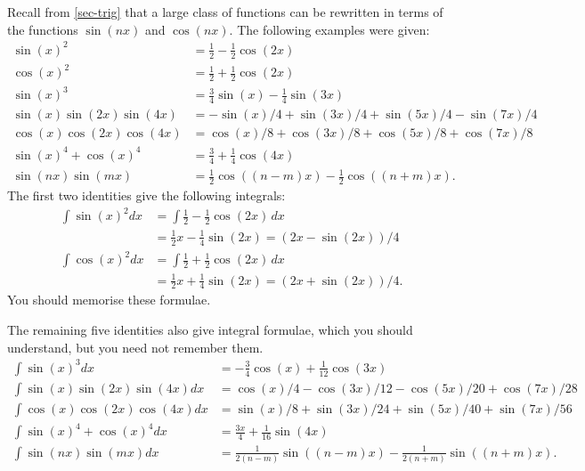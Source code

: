 \documentclass[a4paper]{book}
\renewcommand{\:}{\colon}
\theoremstyle{definition}
\begin{document}
Recall from \autoref{sec-trig} that a large class of functions
can be rewritten in terms of the functions $\sin(nx)$ and $\cos(nx)$.
The following examples were given:
\begin{align*}
 \sin(x)^2 &= \tfrac{1}{2} - \tfrac{1}{2}\cos(2x) \\
 \cos(x)^2 &= \tfrac{1}{2} + \tfrac{1}{2}\cos(2x) \\
 \sin(x)^3 &= \tfrac{3}{4}\sin(x) - \tfrac{1}{4}\sin(3x) \\
 \sin(x)\sin(2x)\sin(4x)
  &= -\sin(x)/4 + \sin(3x)/4 + \sin(5x)/4 - \sin(7x)/4 \\
 \cos(x)\cos(2x)\cos(4x)
  &= \cos(x)/8 + \cos(3x)/8 + \cos(5x)/8 + \cos(7x)/8 \\
 \sin(x)^4 + \cos(x)^4
  &= \tfrac{3}{4} + \tfrac{1}{4}\cos(4x) \\
 \sin(nx)\sin(mx) &=
  \tfrac{1}{2}\cos((n-m)x) - \tfrac{1}{2}\cos((n+m)x).
\end{align*}
The first two identities give the following integrals:
\begin{align*}
 \int \sin(x)^2 dx
  &= \int \tfrac{1}{2} -\tfrac{1}{2} \cos(2x) \,dx \\
  &= \tfrac{1}{2}x - \tfrac{1}{4}\sin(2x) 
   = (2x-\sin(2x))/4 \\
 \int \cos(x)^2 dx
  &= \int \tfrac{1}{2} +\tfrac{1}{2} \cos(2x) \,dx \\
  &= \tfrac{1}{2}x + \tfrac{1}{4}\sin(2x)
   = (2x+\sin(2x))/4.
\end{align*}
You should memorise these formulae.

The remaining five identities also give integral formulae, which you
should understand, but you need not remember them.
\begin{align*}
 \int \sin(x)^3 dx &=
  -\tfrac{3}{4}\cos(x) + \tfrac{1}{12}\cos(3x) \\
 \int \sin(x)\sin(2x)\sin(4x) dx
  &= \cos(x)/4 - \cos(3x)/12 - \cos(5x)/20 + \cos(7x)/28 \\
 \int \cos(x)\cos(2x)\cos(4x) dx
  &= \sin(x)/8 + \sin(3x)/24 + \sin(5x)/40 + \sin(7x)/56 \\
 \int \sin(x)^4 + \cos(x)^4 dx
  &= \tfrac{3x}{4} + \tfrac{1}{16}\sin(4x) \\
 \int \sin(nx)\sin(mx) dx &=
  \tfrac{1}{2(n-m)}\sin((n-m)x) - \tfrac{1}{2(n+m)}\sin((n+m)x).
\end{align*}
\end{document}

